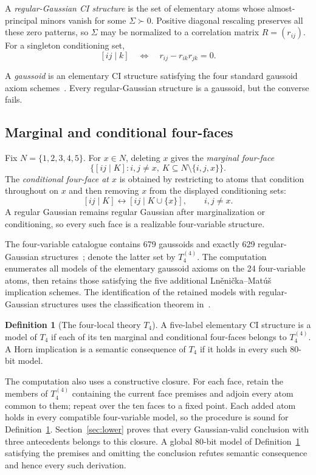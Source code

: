 \documentclass[10pt]{article}
\theoremstyle{definition}
\newtheorem{definition}[theorem]{Definition}
\newcommand{\Tfour}{T_4}
\begin{document}
A \emph{regular-Gaussian CI structure} is the set of elementary atoms whose almost-principal minors vanish for some $\Sigma\succ0$.  Positive diagonal rescaling preserves all these zero patterns, so $\Sigma$ may be normalized to a correlation matrix $R=(r_{ij})$.  For a singleton conditioning set,
\begin{equation}\label{eq:partial}
 [ij\mid k]\quad\Longleftrightarrow\quad r_{ij}-r_{ik}r_{jk}=0.
\end{equation}

A \emph{gaussoid} is an elementary CI structure satisfying the four standard gaussoid axiom schemes~\cite{Matus2005,LM2007,Geometry2019}.  Every regular-Gaussian structure is a gaussoid, but the converse fails.

\subsection{Marginal and conditional four-faces}

Fix $N=\{1,2,3,4,5\}$.  For $x\in N$, deleting $x$ gives the \emph{marginal four-face}
\[
 \{[ij\mid K]:i,j\ne x,\ K\subseteq N\setminus\{i,j,x\}\}.
\]
The \emph{conditional four-face at $x$} is obtained by restricting to atoms that condition throughout on $x$ and then removing $x$ from the displayed conditioning sets:
\[
 [ij\mid K]\longleftrightarrow[ij\mid K\cup\{x\}],\qquad i,j\ne x.
\]
A regular Gaussian remains regular Gaussian after marginalization or conditioning, so every such face is a realizable four-variable structure.

The four-variable catalogue contains 679 gaussoids and exactly 629 regular-Gaussian structures~\cite{LM2007}; denote the latter set by $\Tfour^{(4)}$.  The computation enumerates all models of the elementary gaussoid axioms on the 24 four-variable atoms, then retains those satisfying the five additional Ln\v{e}ni\v{c}ka--Mat\'u\v{s} implication schemes.  The identification of the retained models with regular-Gaussian structures uses the classification theorem in~\cite{LM2007}.

\begin{definition}[The four-local theory $\Tfour$]\label{def:t4}
A five-label elementary CI structure is a model of $\Tfour$ if each of its ten marginal and conditional four-faces belongs to $\Tfour^{(4)}$.  A Horn implication is a semantic consequence of $\Tfour$ if it holds in every such 80-bit model.
\end{definition}

The computation also uses a constructive closure.  For each face, retain the members of $\Tfour^{(4)}$ containing the current face premises and adjoin every atom common to them; repeat over the ten faces to a fixed point.  Each added atom holds in every compatible four-variable model, so the procedure is sound for Definition~\ref{def:t4}.  Section~\ref{sec:lower} proves that every Gaussian-valid conclusion with three antecedents belongs to this closure.  A global 80-bit model of Definition~\ref{def:t4} satisfying the premises and omitting the conclusion refutes semantic consequence and hence every such derivation.
\end{document}
